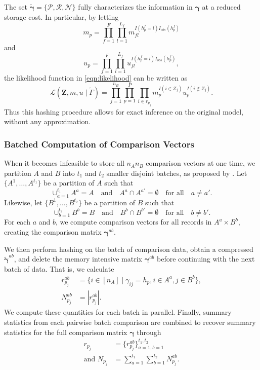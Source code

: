 \documentclass[12pt,letterpaper]{article}
\newcommand{\1}[1]{\mathbb{I}\!\left[#1\right]} %
\begin{document}
The set $\tilde{\bm{\gamma}}=\{ \mathcal{P}, \mathcal{R},\mathcal{N}\}$ fully characterizes the information in $\bm{\gamma}$ at a reduced storage cost. In particular, by letting 
\[
m_p = \prod_{f=1}^F\prod_{l=1}^{L_f} m_{fl}^{I(h_p^{f}=l)I_{obs}(h_p^{f})}
\]
and
\[
u_p = \prod_{f=1}^F\prod_{l=1}^{L_f} u_{fl}^{I(h_p^{f}=l)I_{obs}(h_p^{f})},
\]
the likelihood function in \eqref{eqn:likelihood} can be written as
\begin{equation}
	\label{eq:likelihoodhash}
	\mathcal{L}(\bm{Z}, m,u\mid\tilde{\Gamma})=\prod_{j=1}^{n_B}\prod_{p=1}^{P}\prod_{i\in r_{p_j}}m_p^{I(i \in Z_j)}u_{p}^{I(i \notin Z_j)}.
\end{equation}
Thus this hashing procedure allows for exact inference on the original model, without any approximation.

\subsubsection{Batched Computation of Comparison Vectors} \label{app:batching}
When it becomes infeasible to store all $n_A  n_B$ comparison vectors at one time, we partition $A$ and $B$ into $t_1$ and $t_2$ smaller disjoint batches, as proposed by \cite{kundinger_2023}. Let $\{A^1, \dots, A^{t_1}\}$ be a partition of $A$ such that 
$$\cup_{a=1}^{t_1} A^a = A \quad \text{and} \quad A^a \cap A^{a'}=\emptyset \quad \text{for all} \quad a \neq a'.$$  Likewise, let $\{B^1, \dots, B^{t_2}\}$ be a partition of $B$ such that 
$$\cup_{b=1}^{t_2} B^b = B \quad \text{and} \quad B^b \cap B^{b'}=\emptyset \quad \text{for all} \quad b \neq b'.$$ For each $a$ and $b$, we compute comparison vectors for all records in $A^a \times B^b$, creating the comparison matrix $\bm{\gamma}^{ab}$. 

We then perform hashing on the batch of comparison data, obtain a compressed $\tilde{\bm{\gamma}}^{ab}$, and delete the memory intensive matrix $\bm{\gamma}^{ab}$ before continuing with the next batch of data. That is, we calculate
\begin{align*}
	r_{p_j}^{ab} &= \{i \in [n_A]\mid \gamma_{ij} = h_p, i\in A^a, j \in B^b\}, \\
	N_{p_j}^{ab} &= |r_{p_j}^{ab}|.
\end{align*}
We compute these quantities for each batch in parallel. Finally, summary statistics from each pairwise batch comparison are combined to recover summary statistics for the full comparison matrix $\bm{\gamma}$ through
\begin{align}
	r_{p_j} &= \{r_{p_j}^{ab}\}_{a=1, b=1}^{t_1,t_2} \label{eq:rpj}  \\
	\text{and } N_{p_j} &= \sum_{a = 1}^{t_1} \sum_{b = 1}^{t_2} N_{p_j}^{ab}.\nonumber
\end{align}
\end{document}

